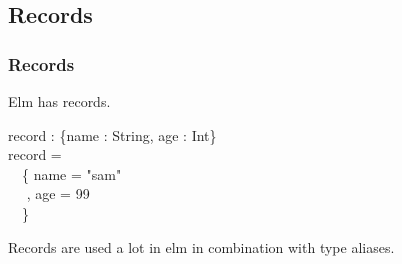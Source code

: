 \subsection{Records}
    \begin{frame}

        \frametitle{Records}
        Elm has records.
    
        \begin{codeexample}
            record : \{name : String, age : Int\}\\
            record = \\
            $\quad$\{ name = "sam"\\
            $\quad$ , age = 99\\
            $\quad$\}
        \end{codeexample}

        Records are used a lot in elm in combination with type aliases.

    \end{frame}